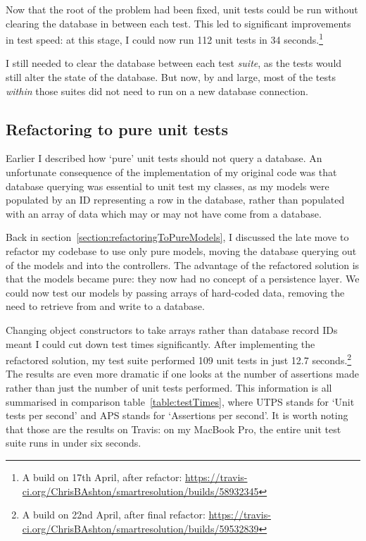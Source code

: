 Now that the root of the problem had been fixed, unit tests could be run without clearing the database in between each test. This led to significant improvements in test speed: at this stage, I could now run 112 unit tests in 34 seconds.\footnote{A build on 17th April, after refactor: \url{https://travis-ci.org/ChrisBAshton/smartresolution/builds/58932345}}

I still needed to clear the database between each test \emph{suite}, as the tests would still alter the state of the database. But now, by and large, most of the tests \emph{within} those suites did not need to run on a new database connection.

\subsection{Refactoring to pure unit tests}

Earlier I described how `pure' unit tests should not query a database. An unfortunate consequence of the implementation of my original code was that database querying was essential to unit test my classes, as my models were populated by an ID representing a row in the database, rather than populated with an array of data which may or may not have come from a database. 

Back in section~\ref{section:refactoringToPureModels}, I discussed the late move to refactor my codebase to use only pure models, moving the database querying out of the models and into the controllers. The advantage of the refactored solution is that the models became pure: they now had no concept of a persistence layer. We could now test our models by passing arrays of hard-coded data, removing the need to retrieve from and write to a database.

Changing object constructors to take arrays rather than database record IDs meant I could cut down test times significantly. After implementing the refactored solution, my test suite performed 109 unit tests in just 12.7 seconds.\footnote{A build on 22nd April, after final refactor: \url{https://travis-ci.org/ChrisBAshton/smartresolution/builds/59532839}} The results are even more dramatic if one looks at the number of assertions made rather than just the number of unit tests performed. This information is all summarised in comparison table~\ref{table:testTimes}, where UTPS stands for `Unit tests per second' and APS stands for `Assertions per second'. It is worth noting that those are the results on Travis: on my MacBook Pro, the entire unit test suite runs in under six seconds.

